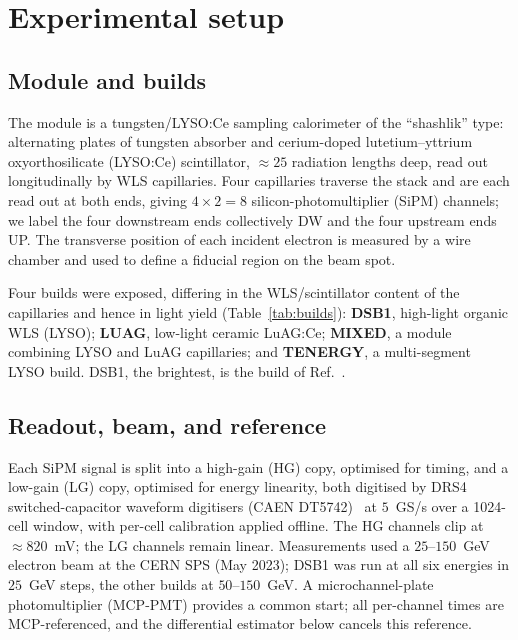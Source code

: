\documentclass[final,5p,times,twocolumn]{elsarticle}
\begin{document}
\section{Experimental setup}
\label{sec:setup}

\subsection{Module and builds}
The module is a tungsten/LYSO:Ce sampling calorimeter of the ``shashlik'' type:
alternating plates of tungsten absorber and cerium-doped lutetium--yttrium
oxyorthosilicate (LYSO:Ce) scintillator, $\approx\!25$ radiation lengths deep, read out
longitudinally by WLS capillaries. Four capillaries traverse the stack and are each read
out at both ends, giving $4\times2 = 8$ silicon-photomultiplier (SiPM) channels; we
label the four downstream ends collectively DW and the four upstream ends UP. The
transverse position of each incident electron is measured by a wire chamber and used to
define a fiducial region on the beam spot.

Four builds were exposed, differing in the WLS/scintillator content of the capillaries
and hence in light yield (Table~\ref{tab:builds}): \textbf{DSB1}, high-light organic WLS
(LYSO);  \textbf{LUAG}, low-light ceramic LuAG:Ce; \textbf{MIXED}, a module combining
LYSO and LuAG capillaries; and \textbf{TENERGY}, a multi-segment LYSO build. DSB1, the
brightest, is the build of Ref.~\cite{radical}.

\subsection{Readout, beam, and reference}
Each SiPM signal is split into a high-gain (HG) copy, optimised for timing, and a
low-gain (LG) copy, optimised for energy linearity, both digitised by DRS4
switched-capacitor waveform digitisers (CAEN DT5742)~\cite{drs4} at $5$~GS/s over a
1024-cell window, with per-cell calibration applied offline. The HG channels clip at
$\approx\!820$~mV; the LG channels remain linear. Measurements used a $25$--$150$~GeV
electron beam at the CERN SPS (May 2023); DSB1 was run at all six energies in $25$~GeV
steps, the other builds at $50$--$150$~GeV. A microchannel-plate photomultiplier
(MCP-PMT) provides a common start; all per-channel times are MCP-referenced, and the
differential estimator below cancels this reference.

\end{document}
